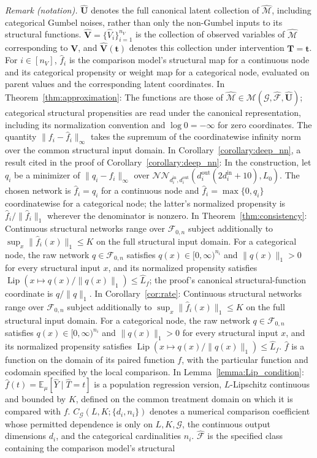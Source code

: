 \documentclass[12pt]{article}
\theoremstyle{plain}
\theoremstyle{definition}
\theoremstyle{remark}
\begin{document}
\noindent\textit{Remark (notation).} $\hat{\boldsymbol{U}}$ denotes the full canonical latent collection of $\hat{\mathcal{M}}$, including categorical Gumbel noises, rather than only the non-Gumbel inputs to its structural functions. $\hat{\boldsymbol{V}}=\{\hat{V}_i\}_{i=1}^{n_V}$ is the collection of observed variables of $\hat{\mathcal{M}}$ corresponding to $\boldsymbol{V}$, and $\hat{\boldsymbol{V}}(\boldsymbol{t})$ denotes this collection under intervention $\boldsymbol{T}=\boldsymbol{t}$. For $i\in[n_V]$, $\hat{f}_i$ is the comparison model's structural map for a continuous node and its categorical propensity or weight map for a categorical node, evaluated on parent values and the corresponding latent coordinates. In Theorem~\ref{thm:approximation}: The functions are those of $\hat{\mathcal{M}}\in\mathcal{M}(\mathcal{G},\hat{\mathcal{F}},\hat{\boldsymbol{U}})$; categorical structural propensities are read under the canonical representation, including its normalization convention and $\log0=-\infty$ for zero coordinates. The quantity $\|f_i-\hat f_i\|_\infty$ takes the supremum of the coordinatewise infinity norm over the common structural input domain. In Corollary~\ref{corollary:deep_nn}, a result cited in the proof of Corollary~\ref{corollary:deep_nn}: In the construction, let $q_i$ be a minimizer of $\|q_i-f_i\|_\infty$ over $\mathcal{NN}_{d_i^{\text{in}},d_i^{\text{out}}}(d_i^{\text{out}}(2d_i^{\text{in}}+10),L_0)$. The chosen network is $\hat{f}_i=q_i$ for a continuous node and $\hat{f}_i=\max\{0,q_i\}$ coordinatewise for a categorical node; the latter's normalized propensity is $\hat{f}_i/\|\hat{f}_i\|_1$ wherever the denominator is nonzero. In Theorem~\ref{thm:consistency}: Continuous structural networks range over $\mathcal{F}_{0,n}$ subject additionally to $\sup_x\|\hat f_i(x)\|_1\leqslant K$ on the full structural input domain. For a categorical node, the raw network $q\in\mathcal{F}_{0,n}$ satisfies $q(x)\in[0,\infty)^{n_i}$ and $\|q(x)\|_1>0$ for every structural input $x$, and its normalized propensity satisfies $\operatorname{Lip}(x\mapsto q(x)/\|q(x)\|_1)\leqslant\hat L_f$; the proof's canonical structural-function coordinate is $q/\|q\|_1$. In Corollary~\ref{cor:rate}: Continuous structural networks range over $\mathcal F_{0,n}$ subject additionally to $\sup_x\|\hat f_i(x)\|_1\leqslant K$ on the full structural input domain. For a categorical node, the raw network $q\in\mathcal F_{0,n}$ satisfies $q(x)\in[0,\infty)^{n_i}$ and $\|q(x)\|_1>0$ for every structural input $x$, and its normalized propensity satisfies $\operatorname{Lip}(x\mapsto q(x)/\|q(x)\|_1)\leqslant\hat L_f$. $\hat{f}$ is a function on the domain of its paired function $f$, with the particular function and codomain specified by the local comparison. In Lemma~\ref{lemma:Lip_condition}: $\hat{f}(t)=\mathbb{E}_{\mu}[\hat{Y}\mid\hat{T}=t]$ is a population regression version, $L$-Lipschitz continuous and bounded by $K$, defined on the common treatment domain on which it is compared with $f$. $C_{\mathcal G}(L,K;\{d_i,n_i\})$ denotes a numerical comparison coefficient whose permitted dependence is only on $L,K,\mathcal G$, the continuous output dimensions $d_i$, and the categorical cardinalities $n_i$. $\hat{\mathcal{F}}$ is the specified class containing the comparison model's structural 
\end{document}
